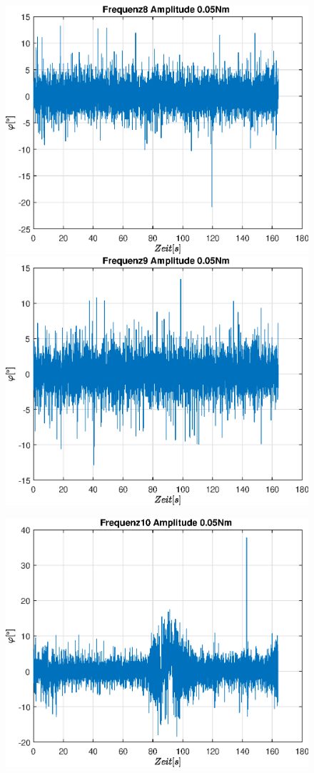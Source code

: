 \documentclass{article}
\begin{document}
\begin{figure}[!h]
\includegraphics[width=0.5\linewidth]{img/phi_sinefreq_8}
\includegraphics[width=0.5\linewidth]{img/phi_sinefreq_9}
\end{figure}
\begin{figure}[!h]
\centering
\includegraphics[width=0.5\linewidth]{img/phi_sinefreq_10}
\end{figure}

\newpage
\end{document}
